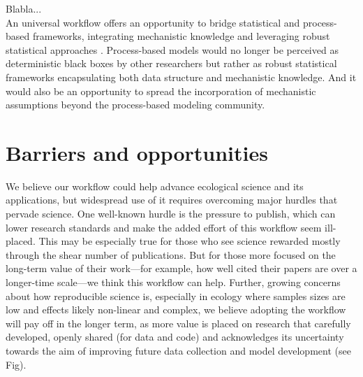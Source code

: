 \documentclass[11pt]{article}
\begin{document}
\begin{tcolorbox}
{\begin{multicols}{2}
\begin{minipage}[t]{\linewidth}
\vspace*{1mm}
\end{minipage}

\columnbreak
\vspace*{1mm}
Blabla... \\
An universal workflow offers an opportunity to bridge statistical and process-based frameworks, integrating mechanistic knowledge and leveraging robust statistical approaches \citep[e.g.][]{rounce2020quantifying}. Process-based models would no longer be perceived as deterministic black boxes by other researchers but rather as robust statistical frameworks encapsulating both data structure and mechanistic knowledge. And it would also be an opportunity to spread the incorporation of mechanistic assumptions beyond the process-based modeling community.

\end{multicols}}

\end{tcolorbox}

\section{Barriers and opportunities}

We believe our workflow could help advance ecological science and its applications, but widespread use of it requires overcoming major hurdles that pervade science.  
One well-known hurdle is the pressure to publish, which can lower research standards and make the added effort of this workflow seem ill-placed. This may be especially true for those who see science rewarded mostly through the shear number of publications. But for those more focused on the long-term value of their work---for example, how well cited their papers are over a longer-time scale---we think this workflow can help. Further, growing concerns about how reproducible science is, especially in ecology where samples sizes are low and effects likely non-linear and complex, we believe adopting the workflow will pay off in the longer term, as more value is placed on research that carefully developed, openly shared (for data and code) and acknowledges its uncertainty towards the aim of improving future data collection and model development (see Fig). 
\end{document}

